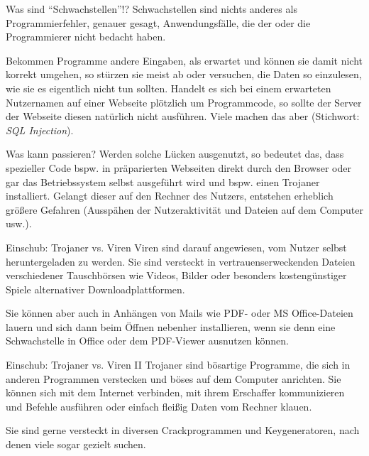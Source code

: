 \documentclass[utf8]{beamer}
\begin{document}
	\begin{frame}{Was sind \enquote{Schwachstellen}!?}
		Schwachstellen sind nichts anderes als Programmierfehler, genauer gesagt, Anwendungsfälle, die der oder die Programmierer nicht bedacht haben. 
		
		Bekommen Programme andere Eingaben, als erwartet und können sie damit nicht korrekt umgehen, so stürzen sie meist ab oder versuchen, die Daten so einzulesen, wie sie es eigentlich nicht tun sollten. Handelt es sich bei einem erwarteten Nutzernamen auf einer Webseite plötzlich um Programmcode, so sollte der Server der Webseite diesen natürlich nicht ausführen. Viele machen das aber (Stichwort: \emph{SQL Injection}).		
	\end{frame}

	\begin{frame}{Was kann passieren?}
		Werden solche Lücken ausgenutzt, so bedeutet das, dass spezieller Code bspw. in präparierten Webseiten direkt durch den Browser oder gar das Betriebssystem selbst ausgeführt wird und bspw. einen Trojaner installiert. Gelangt dieser auf den Rechner des Nutzers, entstehen erheblich größere Gefahren (Ausspähen der Nutzeraktivität und Dateien auf dem Computer usw.).
	\end{frame}

	\begin{frame}{Einschub: Trojaner vs. Viren}
		Viren sind darauf angewiesen, vom Nutzer selbst heruntergeladen zu werden. Sie sind versteckt in vertrauenserweckenden Dateien verschiedener Tauschbörsen wie Videos, Bilder oder besonders kostengünstiger Spiele alternativer Downloadplattformen.
		
		Sie können aber auch in Anhängen von Mails wie PDF- oder MS Office-Dateien lauern und sich dann beim Öffnen nebenher installieren, wenn sie denn eine Schwachstelle in Office oder dem PDF-Viewer ausnutzen können.
	\end{frame}

	\begin{frame}{Einschub: Trojaner vs. Viren II}
		Trojaner sind bösartige Programme, die sich in anderen Programmen verstecken und böses auf dem Computer anrichten. Sie können sich mit dem Internet verbinden, mit ihrem Erschaffer kommunizieren und Befehle ausführen oder einfach fleißig Daten vom Rechner klauen.
		
		Sie sind gerne versteckt in diversen Crackprogrammen und Keygeneratoren, nach denen viele sogar gezielt suchen.
	\end{frame}
\end{document}
